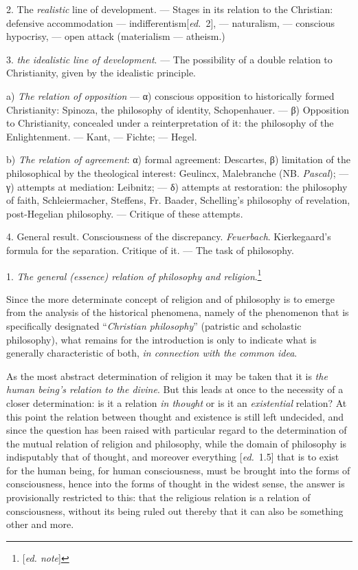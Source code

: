 \documentclass[12pt,a4paper,openany]{book}
\newcommand{\kpage}[1]{\marginnote{\footnotesize\textit{[#1]}}}
\newcommand{\ed}[1]{{\small[\textit{ed.}\ #1]}}
\newcommand{\ednote}[1]{{\small[\textit{ed. note}]}}
\newcommand{\lecture}[1]{\par\bigskip\noindent{\large #1}\par\nobreak\medskip}
\begin{document}
2. The \emph{realistic} line of development. --- Stages in its relation to
the Christian: defensive accommodation --- indifferentism\ed{2},
--- naturalism, --- conscious hypocrisy, --- open attack
(materialism --- atheism.)

3. \emph{the idealistic line of development}. --- The possibility of a double relation
to Christianity, given by the idealistic principle.

a) \emph{The relation of opposition} --- α) conscious opposition to historically
formed Christianity: Spinoza, the philosophy of identity,
Schopenhauer. --- β) Opposition to
Christianity, concealed under a reinterpretation of it:
the philosophy of the Enlightenment. --- Kant, --- Fichte; --- Hegel.

b) \emph{The relation of agreement}: α) formal agreement: Descartes,
β) limitation of the philosophical by the
theological interest: Geulincx, Malebranche (NB.
\kpage{75}\emph{Pascal}); --- γ) attempts at mediation: Leibnitz; --- δ) attempts at restoration:
the philosophy of faith, Schleiermacher, Steffens,
Fr. Baader, Schelling's philosophy of revelation,
post-Hegelian philosophy. --- Critique of these attempts.

4. General result. Consciousness of the discrepancy.
\emph{Feuerbach}. Kierkegaard's formula for the separation. Critique of it.
--- The task of philosophy.

\lecture{\ed{1.4} Lecture 2. Introduction}

1. \emph{The general (essence) relation of philosophy and religion}.\footnote[4]{\ednote{}}

Since the more determinate concept of religion and of philosophy is to
emerge from the analysis of the historical phenomena, namely of the
phenomenon that is specifically designated ``\emph{Christian philosophy}'' (patristic
and scholastic philosophy), what remains for the introduction is only
to indicate what is generally characteristic of both, \emph{in connection with
the common idea}.

As the most abstract determination of religion it may be taken that
it is \emph{the human being's relation to the divine}. But this leads at once to
the necessity of a closer determination: is it a relation \emph{in
thought} or is it an \emph{existential} relation? At this point the relation
between thought and existence is still left undecided, and since the question
has been raised with particular regard to the determination of the mutual relation of religion
and philosophy, while the domain of philosophy
is indisputably that of thought, and moreover everything \ed{1.5} that is to exist
for the human being, for human consciousness, must be brought
into the forms of consciousness, hence into the forms of thought in the widest sense,
the answer is provisionally restricted to this: that the religious relation
is a relation of consciousness, without its being ruled out thereby that it can also
be something other and more.
\end{document}
